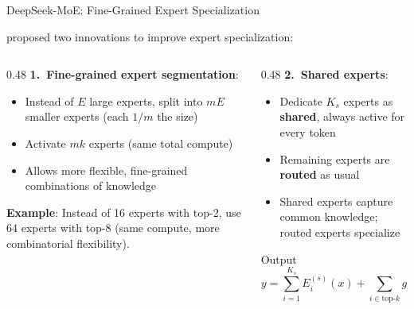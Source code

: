 \begin{frame}{DeepSeek-MoE: Fine-Grained Expert Specialization}

  \cite{dai2024deepseekmoe} proposed two innovations to improve expert specialization:

  \vspace{0.5em}
  \begin{columns}
    \begin{column}{0.48\textwidth}
      \textbf{1.\ Fine-grained expert segmentation}:
      \begin{itemize}
        \item Instead of $E$ large experts, split into $mE$ smaller experts (each $1/m$ the size)
        \item Activate $mk$ experts (same total compute)
        \item Allows more flexible, fine-grained combinations of knowledge
      \end{itemize}

      \vspace{0.3em}
      \textbf{Example}: Instead of 16 experts with top-2, use 64 experts with top-8 (same compute, more combinatorial flexibility).

    \end{column}
    \begin{column}{0.48\textwidth}
      \textbf{2.\ Shared experts}:
      \begin{itemize}
        \item Dedicate $K_s$ experts as \textbf{shared}, always active for every token
        \item Remaining experts are \textbf{routed} as usual
        \item Shared experts capture common knowledge; routed experts specialize
      \end{itemize}

      \vspace{0.3em}
      \begin{block}{Output}
        \vspace{-0.3em}
        \[
          y = \sum_{i=1}^{K_s} E^{(s)}_i(x) + \sum_{i \in \text{top-}k} g_i \cdot E^{(r)}_i(x)
        \]
      \end{block}
    \end{column}
  \end{columns}
\end{frame}

